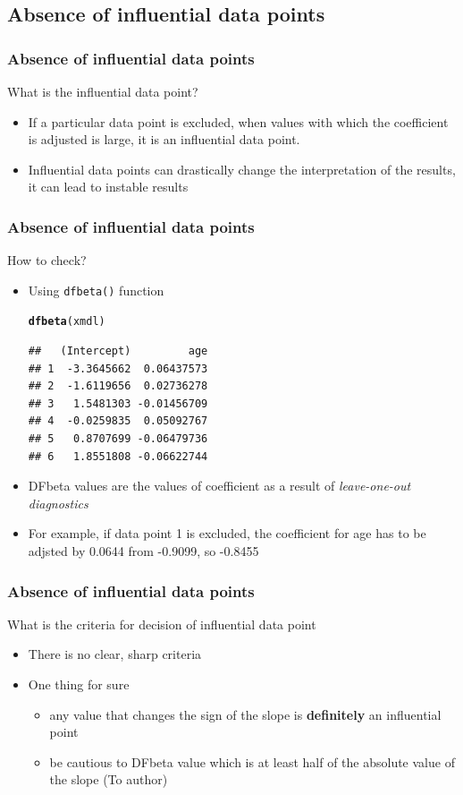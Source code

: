 \documentclass{beamer}\usepackage[]{graphicx}\usepackage[]{color}
\makeatletter
\newcommand{\hlstd}[1]{\textcolor[rgb]{0.345,0.345,0.345}{#1}}%
\newcommand{\hlkwd}[1]{\textcolor[rgb]{0.737,0.353,0.396}{\textbf{#1}}}%
\newenvironment{kframe}{%
 \def\at@end@of@kframe{}%
 \ifinner\ifhmode%
  \def\at@end@of@kframe{\end{minipage}}%
  \begin{minipage}{\columnwidth}%
 \fi\fi%
 \def\FrameCommand##1{\hskip\@totalleftmargin \hskip-\fboxsep
 \colorbox{shadecolor}{##1}\hskip-\fboxsep
     \hskip-\linewidth \hskip-\@totalleftmargin \hskip\columnwidth}%
 \MakeFramed {\advance\hsize-\width
   \@totalleftmargin\z@ \linewidth\hsize
   \@setminipage}}%
 {\par\unskip\endMakeFramed%
 \at@end@of@kframe}
\newenvironment{knitrout}{}{} %
\makeatother
\begin{document}
\subsection{Absence of influential data points}
\begin{frame}
\frametitle{Absence of influential data points}
What is the influential data point?
\begin{itemize}
\item If a particular data point is excluded, when values with which the coefficient is adjusted is large, it is an influential data point.
\item Influential data points can drastically change the interpretation of the results, it can lead to instable results
\end{itemize}
\end{frame}

\begin{frame}[fragile]
\frametitle{Absence of influential data points}
How to check?
\begin{itemize}
\item Using \texttt{dfbeta()} function
\begin{knitrout}\scriptsize
{}\color{fgcolor}\begin{kframe}
\begin{alltt}
\hlkwd{dfbeta}\hlstd{(xmdl)}
\end{alltt}
\begin{verbatim}
##   (Intercept)         age
## 1  -3.3645662  0.06437573
## 2  -1.6119656  0.02736278
## 3   1.5481303 -0.01456709
## 4  -0.0259835  0.05092767
## 5   0.8707699 -0.06479736
## 6   1.8551808 -0.06622744
\end{verbatim}
\end{kframe}
\end{knitrout}
\item DFbeta values are the values of coefficient as a result of \textit{leave-one-out diagnostics}
\item For example, if data point 1 is excluded, the coefficient for age has to be adjsted by 0.0644 from -0.9099, so -0.8455
\end{itemize}
\end{frame}

\begin{frame}
\frametitle{Absence of influential data points}
What is the criteria for decision of influential data point
\begin{itemize}
\item There is no clear, sharp criteria
\item One thing for sure
	\begin{itemize}
	\item any value that changes the sign of the slope is \textbf{definitely} an influential point
	\item be cautious to DFbeta value which is at least half of the absolute value of the slope (To author)
	\end{itemize}
\end{itemize}
\end{frame}
\end{document}
